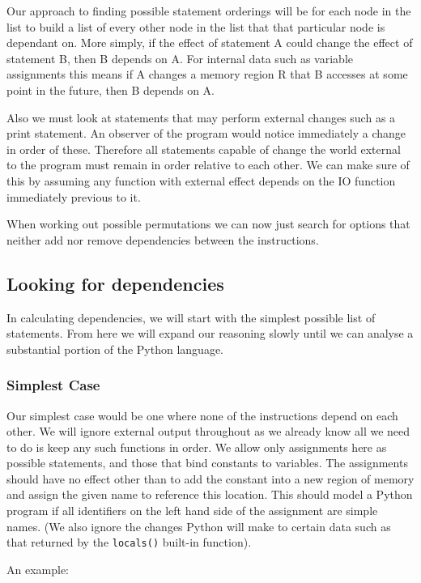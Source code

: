 \documentclass{report}
\begin{document}
Our approach to finding possible statement orderings will be for each node in the list to build a list of every other node in the list that that
particular node is dependant on. More simply, if the effect of statement A could change the effect of statement B, then B depends on A. For internal
data such as variable assignments this means if A changes a memory region R that B accesses at some point in the future, then B depends on A.

Also we must look at statements that may perform external changes such as a print statement. An observer of the program would notice immediately
a change in order of these. Therefore all statements capable of change the world external to the program must remain in order relative to each other.
We can make sure of this by assuming any function with external effect depends on the IO function immediately previous to it.

When working out possible permutations we can now just search for options that neither add nor remove dependencies between the instructions.

\subsection{Looking for dependencies}

In calculating dependencies, we will start with the simplest possible list of statements. From here we will expand our reasoning slowly until
we can analyse a substantial portion of the Python language.

\subsubsection{Simplest Case}

Our simplest case would be one where none of the instructions depend on each other. We will ignore external output throughout as we already know
all we need to do is keep any such functions in order. We allow only assignments here as possible statements, and those that bind constants to
variables. The assignments should have no effect other than to add the constant into a new region of memory and assign the given name to
reference this location. This should model a Python program if all identifiers on the left hand side of the assignment are simple names.
(We also ignore the changes Python will make to certain data such as that returned by the \texttt{locals()} built-in function).

An example:
\end{document}
